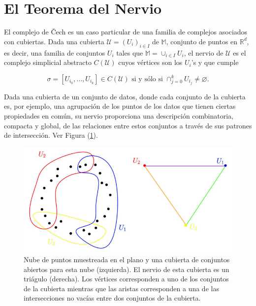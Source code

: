 \section*{El Teorema del Nervio}

El complejo de \v Cech es un caso particular de una familia de complejos asociados con cubiertas. Dada
una cubierta $\mathcal{U}=\left(U_{i}\right)_{i\in I}$ de $\mathbb{M}$, conjunto de puntos en
$\mathbb{R}^{d}$, es decir, una familia de conjuntos $U_{i}$ tales que
$\mathbb{M}=\cup_{i\in I}U_{i}$, el nervio de $\mathcal{U}$ es el complejo simplicial
abstracto $C\left(\mathcal{U}\right)$ cuyos v\'ertices son los $U_{i}$'s y que cumple

\begin{equation*}
    \sigma = \left[U_{i_{0}}, \dots, U_{i_{k}}\right] \in C\left(\mathcal{U}\right)
    \text{ si y s\'olo si } \cap_{j=0}^{k}U_{i_{j}}\neq\varnothing.
\end{equation*}

Dada una cubierta de un conjunto de datos, donde cada conjunto de la cubierta es, por ejemplo, una
agrupaci\'on de los puntos de los datos que tienen ciertas propiedades en com\'un,
su nervio proporciona una descripci\'on combinatoria, compacta y global, de las relaciones
entre estos conjuntos a trav\'es de sus patrones de intersecci\'on. Ver Figura (\ref{fig:Figura 3}).

\begin{figure}[ht]
    \centering
    \includegraphics[width=0.85\linewidth]{./figures/Figura3.png}
    \caption{
        Nube de puntos muestreada en el plano y una cubierta de conjuntos abiertos para esta
        nube (izquierda). El nervio de esta cubierta es un tri\'agulo (derecha).
        Los v\'ertices corresponden a uno de los conjuntos de la cubierta mientras que
        las aristas corresponden a una de las
        intersecciones no vac\'ias entre dos conjuntos de la cubierta.
    }
    \label{fig:Figura 3}
    \vspace{15pt}
\end{figure}


